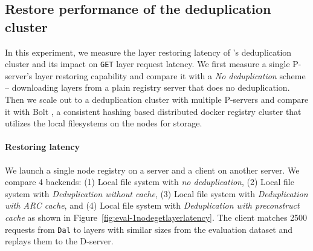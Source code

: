 

\subsection{Restore performance of the deduplication cluster}
\label{sec:eval-dedup}




In this experiment, we measure the layer restoring latency of \sysname's deduplication cluster and its impact on \texttt{GET} layer request latency.
We first measure a single P-server's layer restoring capability and compare it with a \emph{No deduplication} scheme --
downloading layers from a plain registry server that does no deduplication.
Then we scale out to a deduplication cluster with multiple P-servers
and compare it with Bolt \cite{littley2019bolt}, a consistent hashing based distributed docker registry cluster that utilizes the local filesystems on the nodes for storage.
%
%

\paragraph{Restoring latency}
We launch a single node registry on a server and a client on another server.
We compare 4 backends:
(1) Local file system with \emph{no deduplication},
(2) Local file system with \sysname \emph{Deduplication without cache},
(3) Local file system with \sysname \emph{Deduplication with ARC cache}, and
(4) Local file system with \sysname \emph{Deduplication with preconstruct cache}
as shown in Figure~\ref{fig:eval-1nodegetlayerlatency}.
%
The client matches 2500 requests from \texttt{Dal} to layers with similar sizes from the evaluation dataset and replays them to the D-server.

